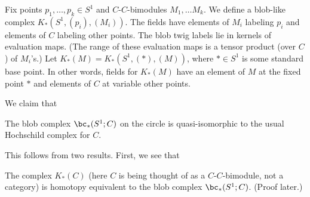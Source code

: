 Fix points $p_1, \ldots, p_k \in S^1$ and $C$-$C$-bimodules $M_1, \ldots M_k$.
We define a blob-like complex $K_*(S^1, (p_i), (M_i))$.
The fields have elements of $M_i$ labeling $p_i$ and elements of $C$ labeling
other points.
The blob twig labels lie in kernels of evaluation maps.
(The range of these evaluation maps is a tensor product (over $C$) of $M_i$'s.)
Let $K_*(M) = K_*(S^1, (*), (M))$, where $* \in S^1$ is some standard base point.
In other words, fields for $K_*(M)$ have an element of $M$ at the fixed point $*$
and elements of $C$ at variable other points.


We claim that
\begin{thm} \label{hochthm}
The blob complex $\bc_*(S^1; C)$ on the circle is quasi-isomorphic to the
usual Hochschild complex for $C$.
\end{thm}

This follows from two results. First, we see that
\begin{lem}
\label{lem:module-blob}%
The complex $K_*(C)$ (here $C$ is being thought of as a
$C$-$C$-bimodule, not a category) is homotopy equivalent to the blob complex
$\bc_*(S^1; C)$. (Proof later.)
\end{lem}

